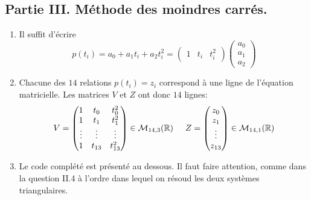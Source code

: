 \subsection*{Partie III. Méthode des moindres carrés.}
\begin{enumerate}
 \item Il suffit d'écrire
\begin{displaymath}
 p(t_i) = a_0 + a_1t_i + a_2 t_{i}^{2}=
\begin{pmatrix}
 1 & t_i & t_i^2
\end{pmatrix}
\begin{pmatrix}
 a_0 \\ a_1 \\ a_2
\end{pmatrix}
\end{displaymath}

 \item Chacune des $14$ relations $p(t_i) = z_i$ correspond à une ligne de l'équation matricielle. Les matrices $V$ et $Z$ ont donc $14$ lignes:
\begin{displaymath}
 V =
\begin{pmatrix}
1 & t_0 & t_0^2 \\ 1 & t_1 & t_1^2 \\ \vdots & \vdots & \vdots \\ 1 & t_{13} & t_{13}^2
\end{pmatrix}
\in \mathcal{M}_{14 , 3}(\mathbb{R})
\hspace{0.5cm}
Z =
\begin{pmatrix}
z_0 \\ z_1 \\ \vdots \\ z_{13} 
\end{pmatrix}
\in \mathcal{M}_{14 , 1}(\mathbb{R})
\end{displaymath}

\item Le code complété est présenté au dessous. Il faut faire attention, comme dans la question II.4 à l'ordre dans lequel on résoud les deux systèmes triangulaires. 

\end{enumerate}
